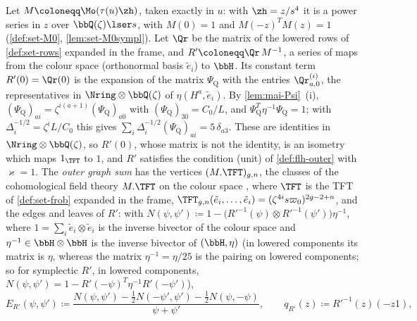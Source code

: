 \begin{defn}
\label{def:set-outer}
Let $M\coloneqq\Mo(\tau(u)\zh)$, taken exactly in $u$: with $\zh=z/s^4$ it is a power series in $z$ over $\bbQ(\zeta)\lser s$, with $M(0)=1$ and $M(-z)^TM(z)=1$ (\cref{def:set-M0}, \cref{lem:set-M0sympl}). Let $\Qr$ be the matrix of the lowered rows of \cref{def:set-rows} expanded in the frame, and $R'\coloneqq\Qr\,M^{-1}$, a series of maps from the colour space (orthonormal basis $\tilde e_i$) to $\bbH$. Its constant term $R'(0)=\Qr(0)$ is the expansion of the matrix $\Psi_{\mathrm Q}$ with the entries $\Qr^{(i)}_{a,0}$, the representatives in $\Nring\otimes\bbQ(\zeta)$ of $\eta(H^a,\tilde e_i)$. By \cref{lem:mai-Psi}~(i), $(\Psi_{\mathrm Q})_{ai}=\zeta^{i(a+1)}(\Psi_{\mathrm Q})_{a0}$ with $(\Psi_{\mathrm Q})_{30}=C_0/L$, and $\Psi_{\mathrm Q}^T\eta^{-1}\Psi_{\mathrm Q}=1$; with $\Delta_i^{-1/2}=\zeta^iL/C_0$ this gives $\sum_i\Delta_i^{-1/2}(\Psi_{\mathrm Q})_{ai}=5\,\delta_{a3}$. These are identities in $\Nring\otimes\bbQ(\zeta)$, so $R'(0)$, whose matrix is not the identity, is an isometry which maps $1_{\TFT}$ to $1$, and $R'$ satisfies the condition (unit) of \cref{def:flh-outer} with $\varkappa=1$. The \emph{outer graph sum} has the vertices $(M.\TFT)_{g,n}$, the classes of the cohomological field theory $M.\TFT$ on the colour space \cite[Def.~2.13]{PPZ15}, where $\TFT$ is the TFT of \cref{def:set-frob} expanded in the frame, $\TFT_{g,n}(\tilde e_i,\dots,\tilde e_i)=(\zeta^{4i}s\varpi_0)^{2g-2+n}$, and the edges and leaves of $R'$: with $N(\psi,\psi')\coloneqq1-\bigl(R'^{-1}(\psi)\otimes R'^{-1}(\psi')\bigr)\eta^{-1}$, where $1=\sum_i\tilde e_i\otimes\tilde e_i$ is the inverse bivector of the colour space and $\eta^{-1}\in\bbH\otimes\bbH$ is the inverse bivector of $(\bbH,\eta)$ (in lowered components its matrix is $\eta$, whereas the matrix $\eta^{-1}=\eta/25$ is the pairing on lowered components; so for symplectic $R'$, in lowered components, $N(\psi,\psi')=1-R'(-\psi)^T\eta^{-1}R'(-\psi')$),
\[
E_{R'}(\psi,\psi')\coloneqq\frac{N(\psi,\psi')-\frac12N(-\psi',\psi')-\frac12N(\psi,-\psi)}{\psi+\psi'},\qquad q_{R'}(z)\coloneqq R'^{-1}(z)(-z1),
\]

\end{defn}
